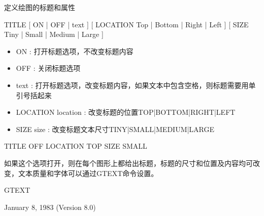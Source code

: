 \label{cmd:title}

定义绘图的标题和属性

TITLE [ ON | OFF | text ] [ LOCATION Top | Bottom | Right | Left ] [ SIZE Tiny | Small | Medium | Large ]

\begin{itemize}
\item ON : 打开标题选项，不改变标题内容
\item OFF : 关闭标题选项 
\item text : 打开标题选项，改变标题内容，如果文本中包含空格，则标题需要用单引号括起来 
\item LOCATION location : 改变标题的位置TOP|BOTTOM|RIGHT|LEFT 
\item SIZE size : 改变标题文本尺寸TINY|SMALL|MEDIUM|LARGE 
\end{itemize}

TITLE OFF LOCATION TOP SIZE SMALL

如果这个选项打开，则在每个图形上都给出标题，标题的尺寸和位置及内容均可改变，文本质量和字体可以通过GTEXT命令设置。

GTEXT

January 8, 1983 (Version 8.0)
